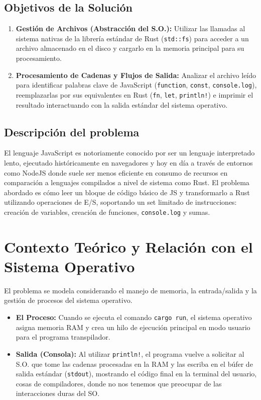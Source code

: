 \documentclass[11pt, letterpaper]{article}
\begin{document}
	\subsection{Objetivos de la Solución}
	\begin{enumerate}
		\item \textbf{Gestión de Archivos (Abstracción del S.O.):} Utilizar las llamadas al sistema nativas de la librería estándar de Rust (\texttt{std::fs}) para acceder a un archivo almacenado en el disco y cargarlo en la memoria principal para su procesamiento.
		\item \textbf{Procesamiento de Cadenas y Flujos de Salida:} Analizar el archivo leído para identificar palabras clave de JavaScript (\texttt{function}, \texttt{const}, \texttt{console.log}), reemplazarlas por sus equivalentes en Rust (\texttt{fn}, \texttt{let}, \texttt{println!}) e imprimir el resultado interactuando con la salida estándar del sistema operativo.
	\end{enumerate}  
	
	\subsection{Descripción del problema}
	El lenguaje JavaScript es notoriamente conocido por ser un lenguaje interpretado lento, ejecutado históricamente en navegadores y hoy en día a través de entornos como NodeJS donde suele ser menos eficiente en consumo de recursos en comparación a lenguajes compilados a nivel de sistema como Rust. El problema abordado es cómo leer un bloque de código básico de JS y transformarlo a Rust utilizando operaciones de E/S, soportando un set limitado de instrucciones: creación de variables, creación de funciones, \texttt{console.log} y sumas.
	
	\newpage
	\section{Contexto Teórico y Relación con el Sistema Operativo}
	
	El problema se modela considerando el manejo de memoria, la entrada/salida y la gestión de procesos del sistema operativo.
	
	\begin{itemize}
		\item \textbf{El Proceso:} Cuando se ejecuta el comando \texttt{cargo run}, el sistema operativo asigna memoria RAM y crea un hilo de ejecución principal en modo usuario para el programa transpilador.
		\item \textbf{Salida (Consola):} Al utilizar \texttt{println!}, el programa vuelve a solicitar al S.O. que tome las cadenas procesadas en la RAM y las escriba en el búfer de salida estándar (\texttt{stdout}), mostrando el código final en la terminal del usuario, cosas de compiladores, donde no nos tenemos que preocupar de las interacciones duras del SO.
	\end{itemize}
	
\end{document}
